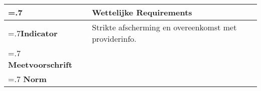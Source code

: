 \noindent
\begin{longtable}{|>{\raggedleft\hsize=.7\hsize\bfseries}X|
    >{\arraybackslash\hsize=1.3\hsize}X|} \hline
\multicolumn{1}{|l|}{\textbf{NFR}} & Wettelijke Requirements\\ \hline
Indicator & Strikte afscherming en overeenkomst met providerinfo.\\  \hline
Meetvoorschrift & \\ \hline
Norm & \\ \hline
\end{longtable}